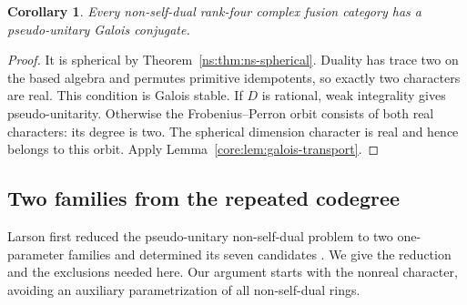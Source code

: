\documentclass[11pt,a4paper]{article}
\newtheorem{corollary}[theorem]{Corollary}
\theoremstyle{definition}\newtheorem{definition}[theorem]{Definition}
\theoremstyle{remark}\newtheorem{remark}[theorem]{Remark}
\numberwithin{equation}{section}
\begin{document}
\begin{corollary}\label{ns:cor:pseudo-unitary-conjugate}
Every non-self-dual rank-four complex fusion category has a
pseudo-unitary Galois conjugate.
\end{corollary}
\begin{proof}
It is spherical by Theorem~\ref{ns:thm:ns-spherical}. Duality has
trace two on the based algebra and permutes primitive idempotents,
so exactly two characters are real. This condition is Galois stable.
If $D$ is rational, weak integrality gives pseudo-unitarity. Otherwise
the Frobenius--Perron orbit consists of both real characters: its
degree is two. The spherical dimension character is real and hence
belongs to this orbit. Apply Lemma~\ref{core:lem:galois-transport}.
\end{proof}

\subsection{Two families from the repeated codegree}

Larson first reduced the pseudo-unitary non-self-dual problem to two
one-parameter families and determined its seven candidates
\cite[Sections~3--5]{Larson}. We give the reduction and the exclusions
needed here. Our argument starts with the nonreal character, avoiding
an auxiliary parametrization of all non-self-dual rings.
\end{document}
